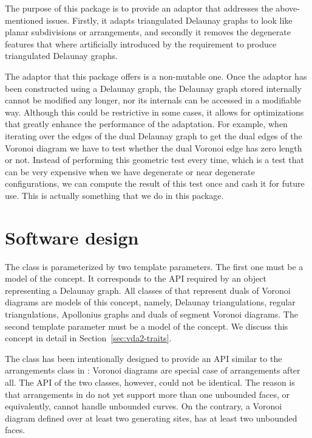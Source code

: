 The purpose of this package is to provide an adaptor that
addresses the above-mentioned issues. Firstly, it adapts
triangulated Delaunay graphs to look like planar subdivisions or
arrangements, and secondly it removes the degenerate features that
where artificially introduced by the requirement to produce
triangulated Delaunay graphs.

The adaptor that this package offers is a non-mutable one. Once
the adaptor has been constructed using a Delaunay graph, the Delaunay
graph stored internally cannot be modified any longer, nor its internals
can be accessed in a modifiable way. Although this could be
restrictive in some cases, it allows for optimizations that greatly
enhance the performance of the adaptation. For example, when iterating
over the edges of the dual Delaunay graph to get the dual edges of the
Voronoi diagram we have to test whether the dual Voronoi edge has zero
length or not. Instead of performing this geometric test every time,
which is a test that can be very expensive when we have degenerate or
near degenerate configurations, we can compute the result of this test
once and cash it for future use. This is actually something that we do
in this package.

\section{Software design}
\label{sec:vda2-design}

The  class is parameterized by
two template parameters. The first one must be a model of the
 concept. It corresponds to the API required by
an object representing a Delaunay graph. All classes of \cgal that
represent duals of Voronoi diagrams are models of this concept,
namely, Delaunay triangulations, regular triangulations, Apollonius
graphs and duals of segment Voronoi diagrams.
%
The second template parameter must be a model of the
 concept. We discuss this concept in detail in
Section~\ref{sec:vda2-traits}.

The  class has been
intentionally designed to provide an API similar to the arrangements
class in \cgal: Voronoi diagrams are special case of arrangements
after all. The API of the two classes, however, could not be
identical. The reason is that arrangements in \cgal do not yet support
more than one unbounded faces, or equivalently, cannot handle
unbounded curves. On the contrary, a Voronoi diagram defined over at
least two generating sites, has at least two unbounded faces.

